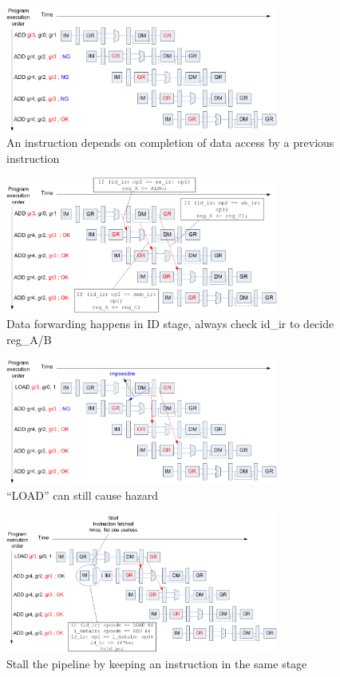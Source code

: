 \documentclass[10pt,a4paper,fleqn]{article}
\begin{document}
\begin{figure}
  \centering
  \includegraphics[width=0.8\textwidth]{figure/DataHazards.png}
  \caption{An instruction depends on completion of data access by a previous instruction}
\end{figure}
\begin{figure}
  \centering
  \includegraphics[width=0.8\textwidth]{figure/DataForwarding.png}
  \caption{Data forwarding happens in ID stage, always check id\_ir to decide reg\_A/B}
\end{figure}
\begin{figure}
  \centering
  \includegraphics[width=0.8\textwidth]{figure/LoadMiss.png}
  \caption{``LOAD'' can still cause hazard}
\end{figure}
\begin{figure}
  \centering
  \includegraphics[width=0.8\textwidth]{figure/Stall.png}
  \caption{Stall the pipeline by keeping an instruction in the same stage}
\end{figure}
\end{document}

